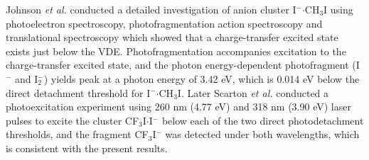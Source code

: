 \documentclass[%
aip,
rsi,
 amsmath,amssymb,
reprint,%
]{revtex4-1}
\begin{document}


Johnson {\it et al.} \cite{cyr_observation_1992,cyr_photoelectron_1993,cyr_charge_1994,dessent_vibrational_1996,doi:10.1021/j100006a002} conducted a detailed investigation of anion cluster I$^-$$\cdot$CH$_3$I using photoelectron spectroscopy, photofragmentation action spectroscopy and translational spectroscopy which showed that a charge-transfer excited state exists just below the VDE. Photofragmentation accompanies excitation to the charge-transfer excited state, and the photon energy-dependent photofragment (I$^-$ and I$_2^-$) yields peak at a photon energy of 3.42 eV, which is 0.014 eV below the direct detachment threshold for I$^-$$\cdot$CH$_3$I\cite{cyr_charge_1994}. Later Scarton {\it et al.} conducted a photoexcitation experiment using 260 nm (4.77 eV) and 318 nm (3.90 eV) laser pulses to excite the cluster CF$_3$I$\cdot$I$^-$ below each of the two direct photodetachment thresholds, and the fragment CF$_3$I$^-$ was detected under both wavelengths\cite{scarton_study_nodate}, which is consistent with the present results.
\end{document}
